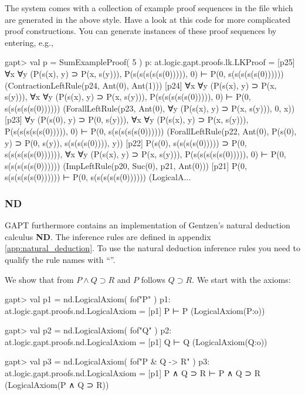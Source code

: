 \documentclass[a4paper,11pt]{article}
\newcommand{\impl}{\supset} %
\renewcommand{\land}{\wedge}
\newcommand{\ND}{\textbf{ND}}
\newcommand{\cli}[1]{{\ttfamily {#1}}}
\begin{document}
The system comes with a collection of example proof sequences in the file
\cli{examples/ProofSequences.scala} which are generated in the above style.
Have a look at this code for more complicated proof constructions.
You can generate instances of these proof sequences by entering, e.g.,
\begin{clilisting}
gapt> val p = SumExampleProof( 5 )
p: at.logic.gapt.proofs.lk.LKProof =
[p25] ∀x ∀y (P(s(x), y) ⊃ P(x, s(y))),
P(s(s(s(s(s(0))))), 0)
⊢
P(0, s(s(s(s(s(0))))))    (ContractionLeftRule(p24, Ant(0), Ant(1)))
[p24] ∀x ∀y (P(s(x), y) ⊃ P(x, s(y))),
∀x ∀y (P(s(x), y) ⊃ P(x, s(y))),
P(s(s(s(s(s(0))))), 0)
⊢
P(0, s(s(s(s(s(0))))))    (ForallLeftRule(p23, Ant(0), ∀y (P(s(x), y) ⊃ P(x, s(y))), 0, x))
[p23] ∀y (P(s(0), y) ⊃ P(0, s(y))),
∀x ∀y (P(s(x), y) ⊃ P(x, s(y))),
P(s(s(s(s(s(0))))), 0)
⊢
P(0, s(s(s(s(s(0))))))    (ForallLeftRule(p22, Ant(0), P(s(0), y) ⊃ P(0, s(y)), s(s(s(s(0)))), y))
[p22] P(s(0), s(s(s(s(0))))) ⊃ P(0, s(s(s(s(s(0)))))),
∀x ∀y (P(s(x), y) ⊃ P(x, s(y))),
P(s(s(s(s(s(0))))), 0)
⊢
P(0, s(s(s(s(s(0))))))    (ImpLeftRule(p20, Suc(0), p21, Ant(0)))
[p21] P(0, s(s(s(s(s(0)))))) ⊢ P(0, s(s(s(s(s(0))))))    (LogicalA...
\end{clilisting}

\subsubsection{ND}

GAPT furthermore contains an implementation of Gentzen's natural deduction
calculus \ND .
The inference rules are defined in appendix \ref{app:natural_deduction}. To use
the natural deduction inference rules you need to qualify the rule names with
``\cli{nd.}''.

We show that from $P \land Q \impl R$ and $P$ follows $Q \impl R$. We start with
the axioms:

\begin{clilisting}
gapt> val p1 = nd.LogicalAxiom( fof"P" )
p1: at.logic.gapt.proofs.nd.LogicalAxiom =
[p1] P ⊢ P    (LogicalAxiom(P:o))

gapt> val p2 = nd.LogicalAxiom( fof"Q" )
p2: at.logic.gapt.proofs.nd.LogicalAxiom =
[p1] Q ⊢ Q    (LogicalAxiom(Q:o))

gapt> val p3 = nd.LogicalAxiom( fof"P & Q -> R" )
p3: at.logic.gapt.proofs.nd.LogicalAxiom =
[p1] P ∧ Q ⊃ R ⊢ P ∧ Q ⊃ R    (LogicalAxiom(P ∧ Q ⊃ R))

\end{clilisting}
\end{document}
